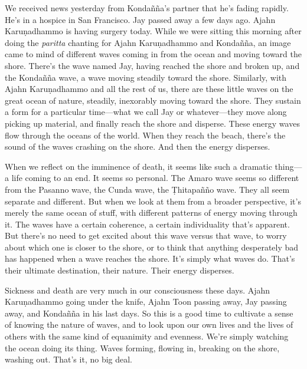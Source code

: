 
We received news yesterday from Kondañña's partner that he's fading 
rapidly. He's in a hospice in San Francisco. Jay passed away a few days 
ago. Ajahn Karuṇadhammo is having surgery today. While we were 
sitting this morning after doing the \emph{paritta} chanting for Ajahn 
Karuṇadhammo and Kondañña, an image came to mind of different waves 
coming in from the ocean and moving toward the shore. There's the wave 
named Jay, having reached the shore and broken up, and the Kondañña 
wave, a wave moving steadily toward the shore. Similarly, with Ajahn 
Karuṇadhammo and all the rest of us, there are these little waves on 
the great ocean of nature, steadily, inexorably moving toward the 
shore. They sustain a form for a particular time---what we call Jay or 
whatever---they move along picking up material, and finally reach the 
shore and disperse. These energy waves flow through the oceans of the 
world. When they reach the beach, there's the sound of the waves 
crashing on the shore. And then the energy disperses.

When we reflect on the imminence of death, it seems like such a 
dramatic thing---a life coming to an end. It seems so personal. The 
Amaro wave seems so different from the Pasanno wave, the Cunda wave, 
the Ṭhitapañño wave. They all seem separate and different. But when 
we look at them from a broader perspective, it's merely the same ocean 
of stuff, with different patterns of energy moving through it. The 
waves have a certain coherence, a certain individuality that's 
apparent. But there's no need to get excited about this wave versus 
that wave, to worry about which one is closer to the shore, or to think 
that anything desperately bad has happened when a wave reaches the 
shore. It's simply what waves do. That's their ultimate destination, 
their nature. Their energy disperses.

Sickness and death are very much in our consciousness these days. Ajahn 
Karuṇadhammo going under the knife, Ajahn Toon passing away, Jay 
passing away, and Kondañña in his last days. So this is a good time 
to cultivate a sense of knowing the nature of waves, and to look upon 
our own lives and the lives of others with the same kind of equanimity 
and evenness. We're simply watching the ocean doing its thing. Waves 
forming, flowing in, breaking on the shore, washing out. That's it, no 
big deal.

